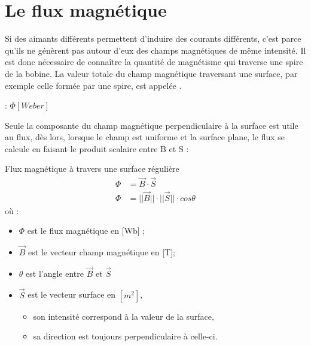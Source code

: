 \section{Le flux magnétique}
Si des aimants différents permettent d'induire des courants différents, c'est parce qu'ils ne génèrent pas autour d'eux des champs magnétiques de même intensité. Il est donc nécessaire de connaître la quantité de magnétisme qui traverse une spire de la bobine.
La valeur totale du champ magnétique traversant une surface, par exemple celle formée par une spire, est appelée .

\begin{encadre}
     : \(\Phi [Weber]\)
\end{encadre}

Seule la composante du champ magnétique perpendiculaire à la surface est utile au flux, dès lors, lorsque le champ est uniforme et la surface plane, le flux se calcule en faisant le produit scalaire entre B et S :

\begin{encadre_equation*}{Flux magnétique à travers une surface régulière}
    \begin{equation}
        \begin{split}
            \Phi & = \vec{B} \cdot \vec{S}                          \\
            \Phi & = ||\vec{B}|| \cdot ||\vec{S}|| \cdot cos \theta
        \end{split}
    \end{equation} où :
    \begin{itemize}[label=\textbullet]
        \item \( \Phi \)  est le flux magnétique en [Wb] ;
        \item \( \vec{B} \) est le vecteur champ magnétique en [T];
        \item \( \theta\) est l'angle entre \( \vec{B} \) et \( \vec{S} \)
        \item \( \vec{S} \) est le vecteur surface en \([m^2]\),
              \begin{itemize}
                  \item son intensité correspond à la valeur de la surface,
                  \item sa direction est toujours perpendiculaire à celle-ci.
              \end{itemize}
    \end{itemize}
\end{encadre_equation*}



